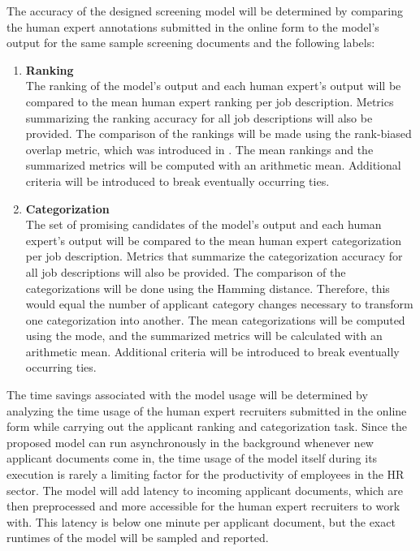\documentclass[draft,final]{thesisclass} %
\begin{document}
The accuracy of the designed screening model will be determined by comparing the human expert annotations submitted in the online form to the model's output for the same sample screening documents and the following labels:
\begin{enumerate}
    \item \textbf{Ranking}\\
    The ranking of the model's output and each human expert's output will be compared to the mean human expert ranking per job description.
    Metrics summarizing the ranking accuracy for all job descriptions will also be provided.
    The comparison of the rankings will be made using the rank-biased overlap metric, which was introduced in \textcite{rank_biased_overlap}. 
    The mean rankings and the summarized metrics will be computed with an arithmetic mean.
    Additional criteria will be introduced to break eventually occurring ties.
    \item \textbf{Categorization}\\
    The set of promising candidates of the model's output and each human expert's output will be compared to the mean human expert categorization per job description.
    Metrics that summarize the categorization accuracy for all job descriptions will also be provided.
    The comparison of the categorizations will be done using the Hamming distance.
    Therefore, this would equal the number of applicant category changes necessary to transform one categorization into another.
    The mean categorizations will be computed using the mode, and the summarized metrics will be calculated with an arithmetic mean.
    Additional criteria will be introduced to break eventually occurring ties.
\end{enumerate}

The time savings associated with the model usage will be determined by analyzing the time usage of the human expert recruiters submitted in the online form while carrying out the applicant ranking and categorization task.
Since the proposed model can run asynchronously in the background whenever new applicant documents come in, the time usage of the model itself during its execution is rarely a limiting factor for the productivity of employees in the \acs{HR} sector.
The model will add latency to incoming applicant documents, which are then preprocessed and more accessible for the human expert recruiters to work with.
This latency is below one minute per applicant document, but the exact runtimes of the model will be sampled and reported.
\end{document}
